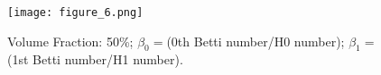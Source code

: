 \begin{figure}
\texttt{[image: figure\_6.png]}
\caption{Volume Fraction: 50\%; $\beta_0 = $(0th Betti number/H0 number); $\beta_1 = $(1st Betti number/H1 number).}
\end{figure}